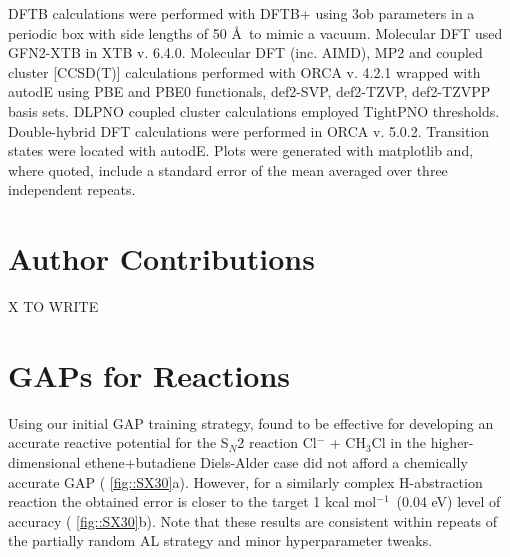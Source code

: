 \documentclass[11pt]{article}
\numberwithin{equation}{subsection}
\newcommand{\kcal}{kcal mol$^{-1}$}
\begin{document}
DFTB calculations were performed with DFTB+\cite{Hourahine2020} using 3ob\cite{Gaus2014} parameters in a periodic box with side lengths of 50 \AA~to mimic a vacuum. Molecular DFT used GFN2-XTB\cite{Bannwarth2019} in XTB v. 6.4.0. Molecular DFT (inc. AIMD), MP2 and coupled cluster [CCSD(T)] calculations performed with ORCA\cite{Neese2017, Neese2020} v. 4.2.1 wrapped with autodE\cite{autodE} using PBE\cite{Perdew1996} and PBE0\cite{Adamo1999} functionals, def2-SVP, def2-TZVP, def2-TZVPP basis sets.\cite{Weigend2005} DLPNO coupled cluster calculations employed TightPNO thresholds.\cite{Yang2018} Double-hybrid DFT calculations were performed in ORCA v. 5.0.2. Transition states were located with autodE. Plots were generated with matplotlib and, where quoted, include a standard error of the mean averaged over three independent repeats.


\section{Author Contributions}
X
{\huge{TO WRITE}}


\clearpage
\section{GAPs for Reactions} \label{section::SI_gap_reactions}

Using our initial GAP training strategy,\cite{gaptrain2021} found to be effective for developing an accurate reactive potential for the S${}_N$2 reaction Cl${}^{-}$ + CH${}_3$Cl in the higher-dimensional ethene+butadiene Diels-Alder case did not afford a chemically accurate GAP (\figurename{ \ref{fig::SX30}a}). However, for a similarly complex H-abstraction reaction the obtained error is closer to the target 1 \kcal~(0.04 eV) level of accuracy (\figurename{ \ref{fig::SX30}b}). Note that these results are consistent within repeats of the partially random AL strategy and minor hyperparameter tweaks.
\end{document}
